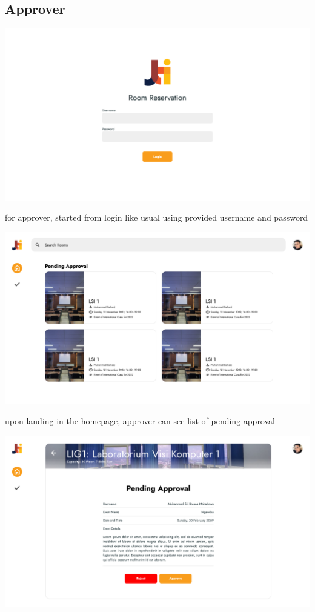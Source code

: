 \documentclass[12pt,titlepage,a4paper]{report}
\begin{document}
    \subsection{Approver}
    \begin{center}
        \includegraphics[width=\textwidth]{images/figures/UIUX/login.png}\\
    \end{center}
    for approver, started from login like usual using provided username and password
    \begin{center}
        \includegraphics[width=\textwidth]{images/figures/UIUX/home 2.png}\\
    \end{center}
    upon landing in the homepage, approver can see list of pending approval
    \begin{center}
        \includegraphics[width=\textwidth]{images/figures/UIUX/approval 1.png}\\
    \end{center}
\end{document}
